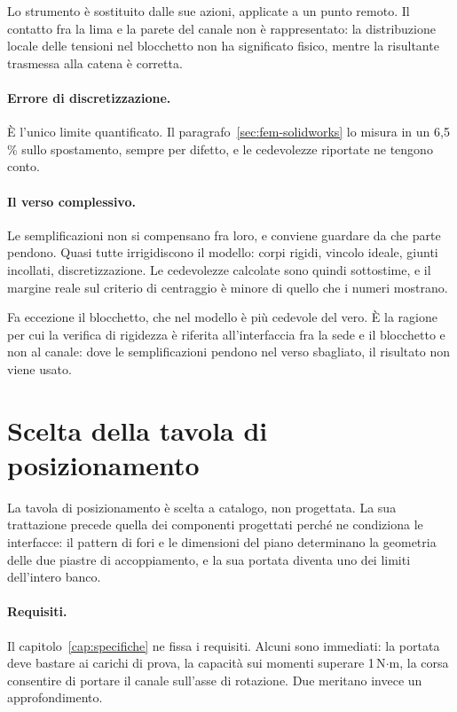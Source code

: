 Lo strumento è sostituito dalle sue azioni, applicate a un punto remoto. Il
contatto fra la lima e la parete del canale non è rappresentato: la
distribuzione locale delle tensioni nel blocchetto non ha significato fisico,
mentre la risultante trasmessa alla catena è corretta.

\paragraph{Errore di discretizzazione.}
È l'unico limite quantificato. Il paragrafo~\ref{sec:fem-solidworks} lo misura
in un 6,5\,\% sullo spostamento, sempre per difetto, e le cedevolezze riportate
ne tengono conto.

\paragraph{Il verso complessivo.}
Le semplificazioni non si compensano fra loro, e conviene guardare da che parte
pendono. Quasi tutte irrigidiscono il modello: corpi rigidi, vincolo ideale,
giunti incollati, discretizzazione. Le cedevolezze calcolate sono quindi
sottostime, e il margine reale sul criterio di centraggio è minore di quello che
i numeri mostrano.

Fa eccezione il blocchetto, che nel modello è più cedevole del vero. È la
ragione per cui la verifica di rigidezza è riferita all'interfaccia fra la sede
e il blocchetto e non al canale: dove le semplificazioni pendono nel verso
sbagliato, il risultato non viene usato.


\section{Scelta della tavola di posizionamento}
\label{sec:tavola}

La tavola di posizionamento è scelta a catalogo, non progettata. La sua
trattazione precede quella dei componenti progettati perché ne condiziona le
interfacce: il pattern di fori e le dimensioni del piano determinano la
geometria delle due piastre di accoppiamento, e la sua portata diventa uno dei
limiti dell'intero banco.

\paragraph{Requisiti.}
Il capitolo~\ref{cap:specifiche} ne fissa i requisiti. Alcuni sono immediati: la
portata deve bastare ai carichi di prova, la capacità sui momenti superare
1\,N$\cdot$m, la corsa consentire di portare il canale sull'asse di rotazione.
Due meritano invece un approfondimento.

